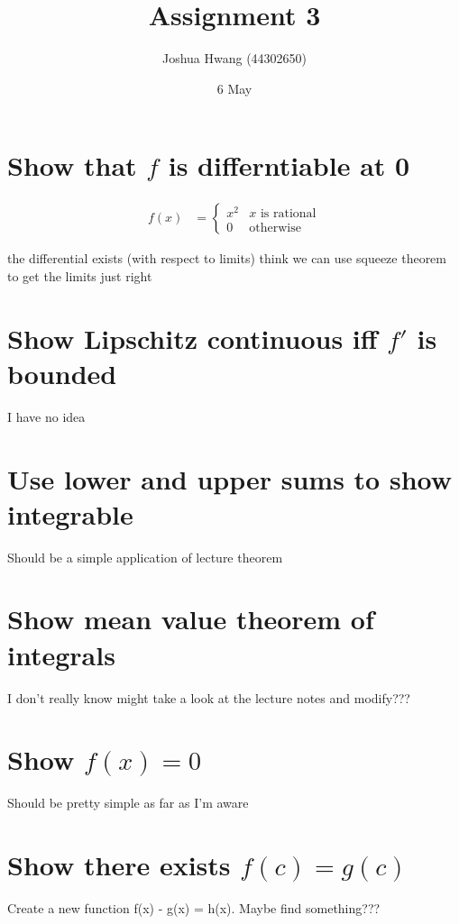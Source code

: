 \documentclass{article}
\title{Assignment 3}
\author{Joshua Hwang (44302650)}
\date{6 May}
\begin{document}
\maketitle

\section{Show that $f$ is differntiable at 0}
\begin{align*}
    f(x)
    &=
    \begin{cases}
        x^2 & \text{$x$ is rational} \\
        0 & \text{otherwise}
    \end{cases}
\end{align*}

the differential exists (with respect to limits)
think we can use squeeze theorem to get the limits just right

\section{Show Lipschitz continuous iff $f'$ is bounded}
I have no idea

\section{Use lower and upper sums to show integrable}
Should be a simple application of lecture theorem

\section{Show mean value theorem of integrals}
I don't really know
might take a look at the lecture notes and modify???

\section{Show $f(x) = 0$}
Should be pretty simple as far as I'm aware

\section{Show there exists $f(c) = g(c)$}
Create a new function f(x) - g(x) = h(x). Maybe find something???
\end{document}
